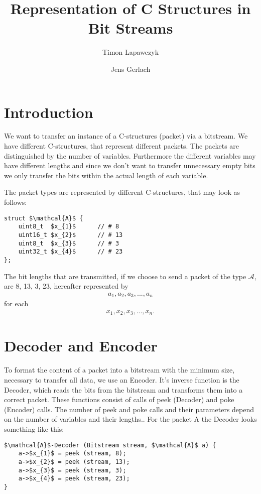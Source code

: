 \documentclass[paper=a4,DIV=12]{scrartcl}
\title{Representation of C Structures in Bit Streams}
\author{Timon Lapawczyk \and Jens Gerlach}
\begin{document}
\maketitle

\section{Introduction}
We want to transfer an instance of a C-structures (packet) via a bitstream.
We have different C-structures, that represent different packets.
The packets are distinguished by the number of variables.
Furthermore the different variables may have different lengths and
since we don't want to transfer unnecessary empty bits we only transfer
the bits within the actual length of each variable.

The packet types are represented by different C-structures, that may look as follows:

\begin{lstlisting}[mathescape]
struct $\mathcal{A}$ {
	uint8_t  $x_{1}$      // # 8
	uint16_t $x_{2}$      // # 13
	uint8_t  $x_{3}$      // # 3
	uint32_t $x_{4}$      // # 23
};
\end{lstlisting}

		The bit lengths that are transmitted, if we choose to send a packet of the type $\mathcal{A}$, are 8, 13, 3, 23, hereafter represented by 
		\begin{align*}
			a_{1}, a_{2}, a_{3}, ... , a_{n}
		\end{align*}
		for each
		\begin{align*}
			x_{1}, x_{2}, x_{3}, ... , x_{n}.
		\end{align*}
	\section{Decoder and Encoder}
		To format the content of a packet into a bitstream with the minimum size, necessary to transfer all data, we use an Encoder. It's inverse function is the Decoder, which reads the bits
		from the bitstream and transforms them into a correct packet.
		These functions consist of calls of peek (Decoder) and poke (Encoder) calls. The number of peek and poke calls and their parameters depend on the number of variables and their lengths..
		For the packet A the Decoder looks something like this:
		\begin{lstlisting}[mathescape]
$\mathcal{A}$-Decoder (Bitstream stream, $\mathcal{A}$ a) {
	a->$x_{1}$ = peek (stream, 8);
	a->$x_{2}$ = peek (stream, 13);
	a->$x_{3}$ = peek (stream, 3);
	a->$x_{4}$ = peek (stream, 23);
}
		\end{lstlisting}
\end{document}
